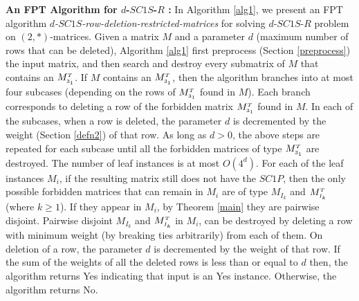\documentclass[review, 1p]{elsarticle}
\begin{document}
\noindent \textbf{An FPT Algorithm for $d$-$SC1S$-$R$ : \newline}
In Algorithm \ref{alg1}, we present an FPT algorithm \textit{$d$-$SC1S$-row-deletion-restricted-matrices} for solving $d$-$SC1S$-$R$ problem on $(2,*)$-matrices. Given a matrix $M$ and a parameter $d$ (maximum number of rows that can be deleted), Algorithm \ref{alg1} first preprocess (Section \ref{preprocess}) the input matrix, and then search and destroy every submatrix of $M$ that contains an ${M^{\mathsmaller T}_{\mathsmaller 3_{1}}}$. If $M$ contains an ${M^{\mathsmaller T}_{\mathsmaller 3_{1}}}$, then the algorithm branches into at most four subcases (depending on the rows of ${M^{\mathsmaller T}_{\mathsmaller 3_{1}}}$ found in $M$). Each branch corresponds to deleting a row of the forbidden matrix ${M^{\mathsmaller T}_{\mathsmaller 3_{1}}}$ found in $M$. In each of the subcases, when a row is deleted, the parameter $d$ is decremented by the weight (Section \ref{defn2}) of that row. As long as $d > 0$, the above steps are repeated for each subcase until all the forbidden matrices of type ${M^{\mathsmaller T}_{\mathsmaller 3_{1}}}$ are destroyed. The number of leaf instances is at most $O(4^{d})$. For each of the leaf instances $M_{i}$, if the resulting matrix still does not have the $SC1P$, then the only possible forbidden matrices that can remain in $M_{i}$ are of type $M_{I_{k}}$ and $M^{\mathsmaller T}_{\mathsmaller{I_{k}}}$ (where $k \geq 1$). If they appear in $M_{i}$, by Theorem \ref{main} they are pairwise disjoint. Pairwise disjoint $M_{I_{k}}$ and $M^{\mathsmaller T}_{\mathsmaller{I_{k}}}$ in $M_{i}$, can be destroyed by deleting a row with minimum weight (by breaking ties arbitrarily) from each of them. On deletion of a row, the parameter $d$ is decremented by the weight of that row. If the sum of the weights of all the deleted rows is less than or equal to $d$ then, the algorithm returns Yes indicating that input is an Yes instance. Otherwise, the algorithm returns No.
\end{document}
